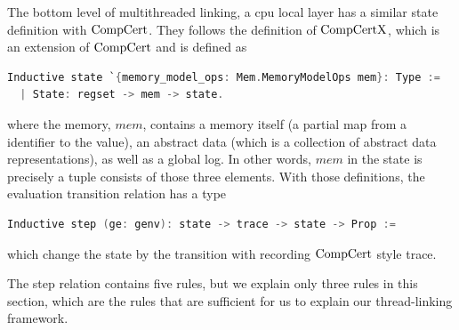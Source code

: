 The bottom level of multithreaded linking, a cpu local layer has a similar state definition with $\mathrm{CompCert}$. 
They follows the definition of $\mathrm{CompCertX}$, 
which is an extension of $\mathrm{CompCert}$ and is defined as
\begin{lstlisting}[language=C]
Inductive state `{memory_model_ops: Mem.MemoryModelOps mem}: Type :=
  | State: regset -> mem -> state.
\end{lstlisting}
where the memory, $mem$, contains a memory itself (a partial map from a identifier to the value), an abstract data (which is a collection of abstract data representations), as well as
a global log.
In other words, 
$mem$ in the state is precisely a tuple consists of those three elements.
With those definitions, the evaluation transition relation has a type
\begin{lstlisting}[language=C]
  Inductive step (ge: genv): state -> trace -> state -> Prop :=
\end{lstlisting}
which change the state by the transition with recording $\mathrm{CompCert}$ style trace. 

The step relation contains five rules, 
but we explain only three rules in this section, which are the rules 
that are sufficient for us to explain our thread-linking framework.

